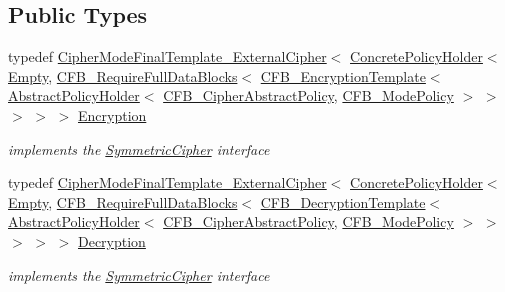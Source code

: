 \subsection*{Public Types}
\begin{DoxyCompactItemize}
\item 
\hypertarget{struct_c_f_b___f_i_p_s___mode___external_cipher_ab8bd472edefe7b4e86eefb86ac1db44c}{
typedef \hyperlink{class_cipher_mode_final_template___external_cipher}{CipherModeFinalTemplate\_\-ExternalCipher}$<$ \hyperlink{class_concrete_policy_holder}{ConcretePolicyHolder}$<$ \hyperlink{class_empty}{Empty}, \hyperlink{class_c_f_b___require_full_data_blocks}{CFB\_\-RequireFullDataBlocks}$<$ \hyperlink{class_c_f_b___encryption_template}{CFB\_\-EncryptionTemplate}$<$ \hyperlink{class_abstract_policy_holder}{AbstractPolicyHolder}$<$ \hyperlink{class_c_f_b___cipher_abstract_policy}{CFB\_\-CipherAbstractPolicy}, \hyperlink{class_c_f_b___mode_policy}{CFB\_\-ModePolicy} $>$ $>$ $>$ $>$ $>$ \hyperlink{struct_c_f_b___f_i_p_s___mode___external_cipher_ab8bd472edefe7b4e86eefb86ac1db44c}{Encryption}}
\label{struct_c_f_b___f_i_p_s___mode___external_cipher_ab8bd472edefe7b4e86eefb86ac1db44c}

\begin{DoxyCompactList}\small\item\em implements the \hyperlink{class_symmetric_cipher}{SymmetricCipher} interface \item\end{DoxyCompactList}\item 
\hypertarget{struct_c_f_b___f_i_p_s___mode___external_cipher_a1ed857b189576655a94ae1c9e3fa5caf}{
typedef \hyperlink{class_cipher_mode_final_template___external_cipher}{CipherModeFinalTemplate\_\-ExternalCipher}$<$ \hyperlink{class_concrete_policy_holder}{ConcretePolicyHolder}$<$ \hyperlink{class_empty}{Empty}, \hyperlink{class_c_f_b___require_full_data_blocks}{CFB\_\-RequireFullDataBlocks}$<$ \hyperlink{class_c_f_b___decryption_template}{CFB\_\-DecryptionTemplate}$<$ \hyperlink{class_abstract_policy_holder}{AbstractPolicyHolder}$<$ \hyperlink{class_c_f_b___cipher_abstract_policy}{CFB\_\-CipherAbstractPolicy}, \hyperlink{class_c_f_b___mode_policy}{CFB\_\-ModePolicy} $>$ $>$ $>$ $>$ $>$ \hyperlink{struct_c_f_b___f_i_p_s___mode___external_cipher_a1ed857b189576655a94ae1c9e3fa5caf}{Decryption}}
\label{struct_c_f_b___f_i_p_s___mode___external_cipher_a1ed857b189576655a94ae1c9e3fa5caf}

\begin{DoxyCompactList}\small\item\em implements the \hyperlink{class_symmetric_cipher}{SymmetricCipher} interface \item\end{DoxyCompactList}\end{DoxyCompactItemize}


